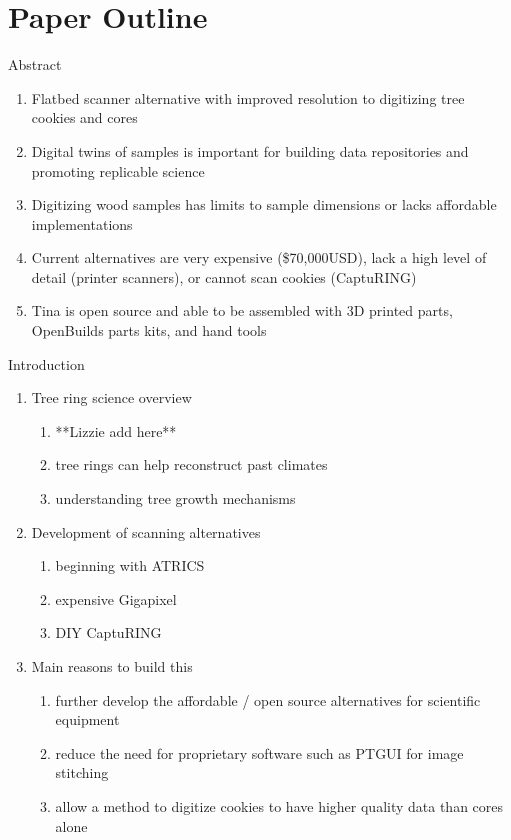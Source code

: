 \documentclass{article}
\begin{document}
\section {Paper Outline}
\begin{outline}[enumerate]

\1 Abstract
\begin{enumerate}
	\item Flatbed scanner alternative with improved resolution to digitizing tree cookies and cores
	\item Digital twins of samples is important for building data repositories and promoting replicable science
	\item Digitizing wood samples has limits to sample dimensions or lacks affordable implementations
	\item 	Current alternatives are very expensive (\$70,000USD), lack a high level of detail (printer scanners), or cannot scan cookies (CaptuRING)
	\item Tina is open source and able to be assembled with 3D printed parts, OpenBuilds parts kits, and hand tools
\end{enumerate}
\item Introduction
	\begin{enumerate}
	\item Tree ring science overview
		\begin{enumerate}
		\item **Lizzie add here**
		\item tree rings can help reconstruct past climates 
		\item understanding tree growth mechanisms
		\end{enumerate}
	\item Development of scanning alternatives
		\begin{enumerate}
		\item beginning with ATRICS
		\item expensive Gigapixel
		\item DIY CaptuRING
		\end{enumerate}
	\item Main reasons to build this 
		\begin{enumerate}
		\item further develop the affordable / open source alternatives for scientific equipment
		\item reduce the need for proprietary software such as PTGUI for image stitching
		\item allow a method to digitize cookies to have higher quality data than cores alone

\end{enumerate}
\end{enumerate}
\end{outline}
\end{document}
